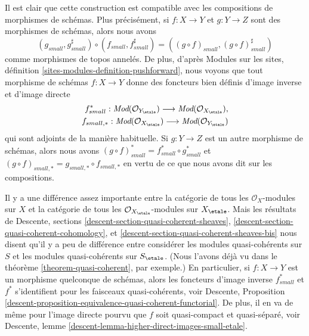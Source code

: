 \medskip\noindent
Il est clair que cette construction est compatible avec les compositions de
morphismes de sch\'emas. Plus pr\'ecis\'ement, si $f : X \to Y$ et $g : Y \to Z$
sont des morphismes de sch\'emas, alors nous avons
$$
(g_{small}, g_{small}^\sharp)
\circ
(f_{small}, f_{small}^\sharp)
=
((g \circ f)_{small}, (g \circ f)_{small}^\sharp)
$$
comme morphismes de topos annel\'es. De plus, d'apr\`es
Modules sur les sites, définition \ref{sites-modules-definition-pushforward},
nous voyons que tout morphisme de sch\'emas $f : X \to Y$
donne des foncteurs bien d\'efinis d'image inverse et d'image directe
\begin{align*}
f_{small}^* :
\textit{Mod}(\mathcal{O}_{Y_\etale})
\longrightarrow
\textit{Mod}(\mathcal{O}_{X_\etale}), \\
f_{small, *} :
\textit{Mod}(\mathcal{O}_{X_\etale})
\longrightarrow
\textit{Mod}(\mathcal{O}_{Y_\etale})
\end{align*}
qui sont adjoints de la mani\`ere habituelle. Si $g : Y \to Z$ est un autre morphisme
de sch\'emas, alors nous avons
$(g \circ f)_{small}^* = f_{small}^* \circ g_{small}^*$
et $(g \circ f)_{small, *} = g_{small, *} \circ f_{small, *}$
en vertu de ce que nous avons dit sur les compositions.

\medskip\noindent
Il y a une diff\'erence assez importante entre la cat\'egorie
de tous les $\mathcal{O}_X$-modules sur $X$ et la cat\'egorie de tous les
$\mathcal{O}_{X_\etale}$-modules sur $X_\etale$. Mais les
r\'esultats de
Descente, sections \ref{descent-section-quasi-coherent-sheaves},
\ref{descent-section-quasi-coherent-cohomology}, et
\ref{descent-section-quasi-coherent-sheaves-bis}
nous disent qu'il y a peu de diff\'erence entre consid\'erer les modules quasi-coh\'erents
sur $S$ et les modules quasi-coh\'erents sur $S_\etale$.
(Nous l'avons d\'ej\`a vu dans le
th\'eor\`eme \ref{theorem-quasi-coherent},
par exemple.)
En particulier, si $f : X \to Y$ est un morphisme quelconque de sch\'emas, alors
les foncteurs d'image inverse $f_{small}^*$ et $f^*$ s'identifient pour les
faisceaux quasi-coh\'erents, voir
Descente,
Proposition \ref{descent-proposition-equivalence-quasi-coherent-functorial}.
De plus, il en va de m\^eme pour l'image directe pourvu que $f$ soit
quasi-compact et quasi-s\'epar\'e, voir
Descente, lemme \ref{descent-lemma-higher-direct-images-small-etale}.

